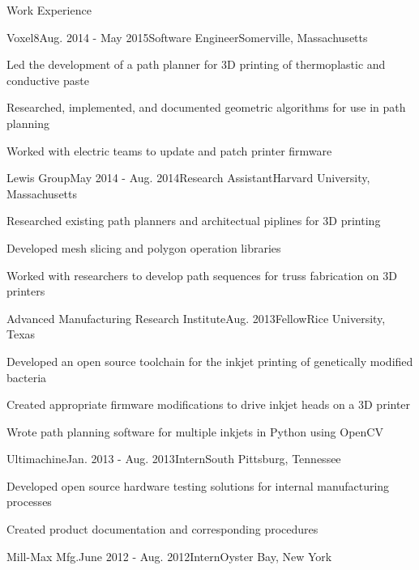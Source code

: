 \documentclass{./sjkelly_resume} 					%
\begin{document}
\begin{mainSection}{Work Experience}
	\begin{experienceSubsection}{Voxel8}{Aug. 2014 - May 2015}{Software Engineer}{Somerville, Massachusetts}
		\item Led the development of a path planner for 3D printing of thermoplastic and conductive paste
		\item Researched, implemented, and documented geometric algorithms for use in path planning
		\item Worked with electric teams to update and patch printer firmware
	\end{experienceSubsection}
	\begin{experienceSubsection}{Lewis Group}{May 2014 - Aug. 2014}{Research Assistant}{Harvard University, Massachusetts}
		\item Researched existing path planners and architectual piplines for 3D printing
		\item Developed mesh slicing and polygon operation libraries
		\item Worked with researchers to develop path sequences for truss fabrication on 3D printers
	\end{experienceSubsection}
	\begin{experienceSubsection}{Advanced Manufacturing Research Institute}{Aug. 2013}{Fellow}{Rice University, Texas}
		\item Developed an open source toolchain for the inkjet printing of genetically modified bacteria
		\item Created appropriate firmware modifications to drive inkjet heads on a 3D printer
		\item Wrote path planning software for multiple inkjets in Python using OpenCV 
	\end{experienceSubsection}
	\begin{experienceSubsection}{Ultimachine}{Jan. 2013 - Aug. 2013}{Intern}{South Pittsburg, Tennessee}
		\item Developed open source hardware testing solutions for internal manufacturing processes
		\item Created product documentation and corresponding procedures
	\end{experienceSubsection}
	\begin{experienceSubsection}{Mill-Max Mfg.}{June 2012 - Aug. 2012}{Intern}{Oyster Bay, New York}

\end{experienceSubsection}
\end{mainSection}
\end{document}
